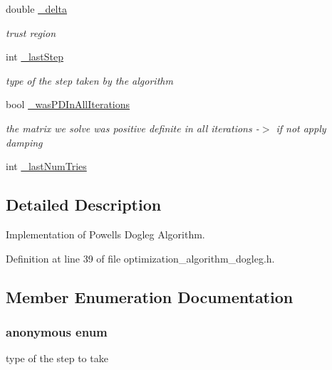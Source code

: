 \begin{DoxyCompactItemize}
double \hyperlink{classg2o_1_1OptimizationAlgorithmDogleg_a3484b12efddd9fc0051100634effecd6}{\+\_\+delta}
\begin{DoxyCompactList}\small\item\em trust region \end{DoxyCompactList}\item 
int \hyperlink{classg2o_1_1OptimizationAlgorithmDogleg_a3bf898af0087c0ed8287d0cd13e4c943}{\+\_\+last\+Step}
\begin{DoxyCompactList}\small\item\em type of the step taken by the algorithm \end{DoxyCompactList}\item 
bool \hyperlink{classg2o_1_1OptimizationAlgorithmDogleg_af921ebbebaf059f73e410fc751616ec2}{\+\_\+was\+P\+D\+In\+All\+Iterations}
\begin{DoxyCompactList}\small\item\em the matrix we solve was positive definite in all iterations -\/$>$ if not apply damping \end{DoxyCompactList}\item 
int \hyperlink{classg2o_1_1OptimizationAlgorithmDogleg_aeab37f3f587dc8b37b5a42d36fd8217c}{\+\_\+last\+Num\+Tries}
\end{DoxyCompactItemize}


\subsection{Detailed Description}
Implementation of Powell\textquotesingle{}s Dogleg Algorithm. 

Definition at line 39 of file optimization\+\_\+algorithm\+\_\+dogleg.\+h.



\subsection{Member Enumeration Documentation}
\subsubsection[{\texorpdfstring{anonymous enum}{anonymous enum}}]{\setlength{\rightskip}{0pt plus 5cm}anonymous enum}\hypertarget{classg2o_1_1OptimizationAlgorithmDogleg_ae4f6faede88712ebaee01baf8cf20505}{}\label{classg2o_1_1OptimizationAlgorithmDogleg_ae4f6faede88712ebaee01baf8cf20505}


type of the step to take 

